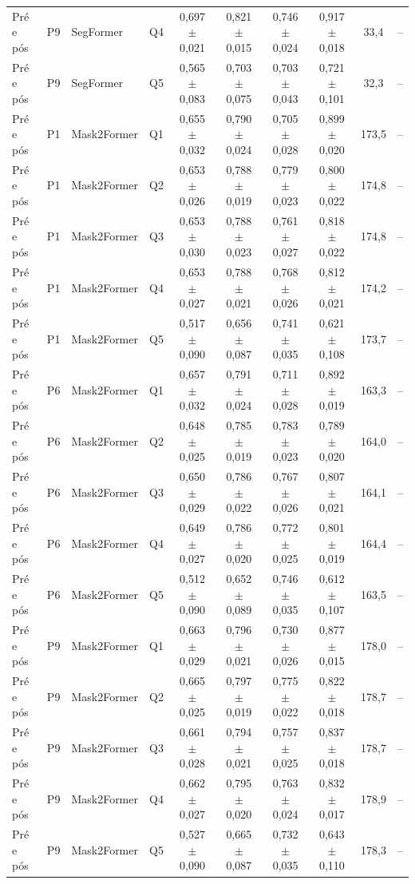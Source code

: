 {\begin{longtable}{llllcccccc}
Pré e pós & P9 & SegFormer & Q4 & 0,697 $\pm$ 0,021 & 0,821 $\pm$ 0,015 & 0,746 $\pm$ 0,024 & 0,917 $\pm$ 0,018 & 33,4 & -- \\
Pré e pós & P9 & SegFormer & Q5 & 0,565 $\pm$ 0,083 & 0,703 $\pm$ 0,075 & 0,703 $\pm$ 0,043 & 0,721 $\pm$ 0,101 & 32,3 & -- \\
Pré e pós & P1 & Mask2Former & Q1 & 0,655 $\pm$ 0,032 & 0,790 $\pm$ 0,024 & 0,705 $\pm$ 0,028 & 0,899 $\pm$ 0,020 & 173,5 & -- \\
Pré e pós & P1 & Mask2Former & Q2 & 0,653 $\pm$ 0,026 & 0,788 $\pm$ 0,019 & 0,779 $\pm$ 0,023 & 0,800 $\pm$ 0,022 & 174,8 & -- \\
Pré e pós & P1 & Mask2Former & Q3 & 0,653 $\pm$ 0,030 & 0,788 $\pm$ 0,023 & 0,761 $\pm$ 0,027 & 0,818 $\pm$ 0,022 & 174,8 & -- \\
Pré e pós & P1 & Mask2Former & Q4 & 0,653 $\pm$ 0,027 & 0,788 $\pm$ 0,021 & 0,768 $\pm$ 0,026 & 0,812 $\pm$ 0,021 & 174,2 & -- \\
Pré e pós & P1 & Mask2Former & Q5 & 0,517 $\pm$ 0,090 & 0,656 $\pm$ 0,087 & 0,741 $\pm$ 0,035 & 0,621 $\pm$ 0,108 & 173,7 & -- \\
Pré e pós & P6 & Mask2Former & Q1 & 0,657 $\pm$ 0,032 & 0,791 $\pm$ 0,024 & 0,711 $\pm$ 0,028 & 0,892 $\pm$ 0,019 & 163,3 & -- \\
Pré e pós & P6 & Mask2Former & Q2 & 0,648 $\pm$ 0,025 & 0,785 $\pm$ 0,019 & 0,783 $\pm$ 0,023 & 0,789 $\pm$ 0,020 & 164,0 & -- \\
Pré e pós & P6 & Mask2Former & Q3 & 0,650 $\pm$ 0,029 & 0,786 $\pm$ 0,022 & 0,767 $\pm$ 0,026 & 0,807 $\pm$ 0,021 & 164,1 & -- \\
Pré e pós & P6 & Mask2Former & Q4 & 0,649 $\pm$ 0,027 & 0,786 $\pm$ 0,020 & 0,772 $\pm$ 0,025 & 0,801 $\pm$ 0,019 & 164,4 & -- \\
Pré e pós & P6 & Mask2Former & Q5 & 0,512 $\pm$ 0,090 & 0,652 $\pm$ 0,089 & 0,746 $\pm$ 0,035 & 0,612 $\pm$ 0,107 & 163,5 & -- \\
Pré e pós & P9 & Mask2Former & Q1 & 0,663 $\pm$ 0,029 & 0,796 $\pm$ 0,021 & 0,730 $\pm$ 0,026 & 0,877 $\pm$ 0,015 & 178,0 & -- \\
Pré e pós & P9 & Mask2Former & Q2 & 0,665 $\pm$ 0,025 & 0,797 $\pm$ 0,019 & 0,775 $\pm$ 0,022 & 0,822 $\pm$ 0,018 & 178,7 & -- \\
Pré e pós & P9 & Mask2Former & Q3 & 0,661 $\pm$ 0,028 & 0,794 $\pm$ 0,021 & 0,757 $\pm$ 0,025 & 0,837 $\pm$ 0,018 & 178,7 & -- \\
Pré e pós & P9 & Mask2Former & Q4 & 0,662 $\pm$ 0,027 & 0,795 $\pm$ 0,020 & 0,763 $\pm$ 0,024 & 0,832 $\pm$ 0,017 & 178,9 & -- \\
Pré e pós & P9 & Mask2Former & Q5 & 0,527 $\pm$ 0,090 & 0,665 $\pm$ 0,087 & 0,732 $\pm$ 0,035 & 0,643 $\pm$ 0,110 & 178,3 & -- \\
\end{longtable}}
